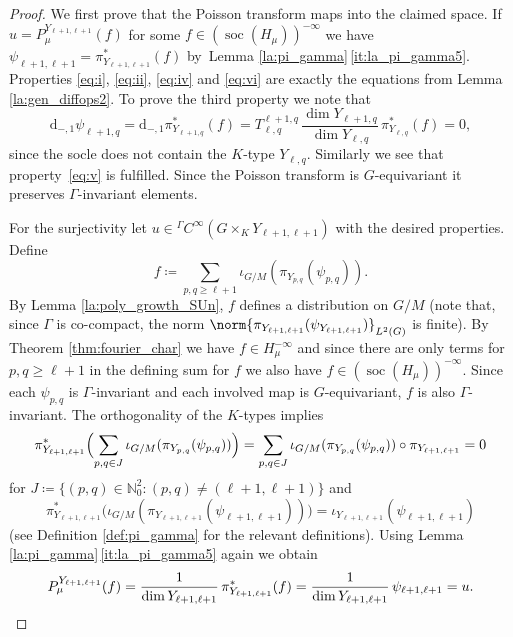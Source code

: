 \documentclass[JEP,XML,SOM,NoFloatCountersInSection,Unicode,published]{cedram}
\newcommand{\Ga}{{}^\Gamma\!}
\theoremstyle{definition}
\DeclarePairedDelimiter{\norm}\lVert\rVert
\newcommand{\on}[1]{\ensuremath{\operatorname{#1}}}
\newcommand{\N}{\ensuremath{\mathbb{N}}}
\newcommand{\pst}[1]{\ensuremath{H_{#1}}}
\newcommand{\pstd}[1]{\ensuremath{H_{#1}^{-\infty}}}
\begin{document}
\begin{proof}
We first prove that the Poisson transform maps into the claimed space. If $u=P_\mu^{Y_{\ell+1,\ell+1}}(f)$ for some $f\in(\on{soc}(\pst{\mu}))^{-\infty}$ we have $\psi_{\ell+1,\ell+1}=\pi_{Y_{\ell+1,\ell+1}}^*(f)$ by~Lemma \ref{la:pi_gamma}\,\eqref{it:la_pi_gamma5}. Properties \eqref{eq:i}, \eqref{eq:ii}, \eqref{eq:iv} and \eqref{eq:vi} are exactly the equations from Lemma \ref{la:gen_diffops2}. To prove the third property we note that
\[
\mathrm{d}_{-,1}\psi_{\ell+1,q}=\mathrm{d}_{-,1}\pi_{Y_{\ell+1,q}}^*(f)=T_{\ell,q}^{\ell+1,q}\,\frac{\dim Y_{\ell+1,q}}{\dim Y_{\ell,q}}\,\pi_{Y_{\ell,q}}^*(f)=0,
\]
since the socle does not contain the $K$-type $Y_{\ell,q}$. Similarly we see that property~\eqref{eq:v} is fulfilled. Since the Poisson transform is $G$-equivariant it preserves $\Gamma$-invariant elements.

For the surjectivity let $u\in {}\Ga C^\infty(G\times_KY_{\ell+1,\ell+1})$ with the desired properties. Define\vspace*{-3pt}
\[
f\coloneqq\sum_{p,q\geq\ell+1}\iota_{G/M}(\pi_{Y_{p,q}}(\psi_{p,q})).
\]
By Lemma \ref{la:poly_growth_SUn}, $f$ defines a distribution on $G/M$ (note that, since $\Gamma$ is co-compact, the norm $\norm{\pi_{Y_{\ell+1,\ell+1}}(\psi_{Y_{\ell+1,\ell+1}})}_{L^2(G)}$ is finite). By Theorem \ref{thm:fourier_char} we have $f\in\pstd{\mu}$ and since there are only terms for $p,q\geq\ell+1$ in the defining sum for $f$ we also have $f\in(\on{soc}(\pst{\mu}))^{-\infty}$. Since each $\psi_{p,q}$ is $\Gamma$-invariant and each involved map is $G$-equivariant, $f$ is also $\Gamma$-invariant. The orthogonality of the $K$-types implies\vspace*{-3pt}
\[
\pi_{Y_{\ell+1,\ell+1}}^*\Bigl(\sum_{p,q\in J}\iota_{G/M}(\pi_{Y_{p,q}}(\psi_{p,q}))\Bigr)=\sum_{p,q\in J}\iota_{G/M}(\pi_{Y_{p,q}}(\psi_{p,q}))\circ\pi_{Y_{\ell+1,\ell+1}}=0
\]
for $J\coloneqq\{(p,q)\in\N_0^2\colon(p,q)\neq(\ell+1,\ell+1)\}$ and\vspace*{-3pt}
\[
\pi_{Y_{\ell+1,\ell+1}}^*\bigl(\iota_{G/M}(\pi_{Y_{\ell+1,\ell+1}}(\psi_{\ell+1,\ell+1}))\bigr)=\iota_{Y_{\ell+1,\ell+1}}(\psi_{\ell+1,\ell+1})
\]
(see Definition \ref{def:pi_gamma} for the relevant definitions). Using Lemma \ref{la:pi_gamma}\,\eqref{it:la_pi_gamma5} again we obtain
\[
P_\mu^{Y_{\ell+1,\ell+1}}(f)=\frac{1}{\dim Y_{\ell+1,\ell+1}}\,\pi_{Y_{\ell+1,\ell+1}}^*(f)=\frac{1}{\dim Y_{\ell+1,\ell+1}}\,\psi_{\ell+1,\ell+1}=u.\qedhere
\]
\end{proof}
\end{document}
